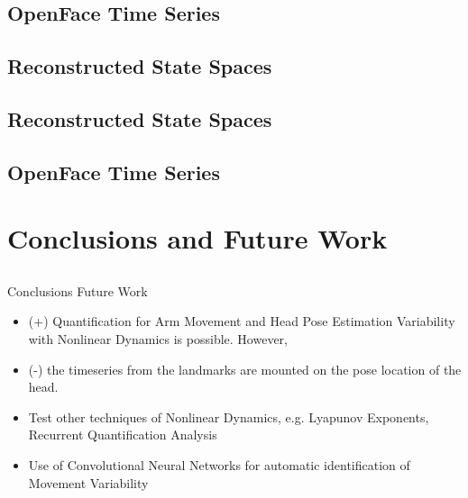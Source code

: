 \documentclass[compress]{beamer}
\begin{document}
\subsection{OpenFace Time Series}


\subsection{Reconstructed State Spaces}


\subsection{Reconstructed State Spaces}



\subsection{OpenFace Time Series}





\section{Conclusions and Future Work}

\subsection{}
{
\begin{frame}{Conclusions Future Work}

\begin{itemize}
	\item (+) Quantification for Arm Movement and Head Pose Estimation Variability with Nonlinear Dynamics is possible. However,
	\item (-) the timeseries from the landmarks are mounted on the pose location of the head. 
\end{itemize}

\begin{itemize}
	\item Test other techniques of Nonlinear Dynamics, e.g. Lyapunov Exponents, Recurrent Quantification Analysis
	\item Use of Convolutional Neural Networks for automatic identification of Movement Variability
\end{itemize}



\end{frame}
}
\end{document}
